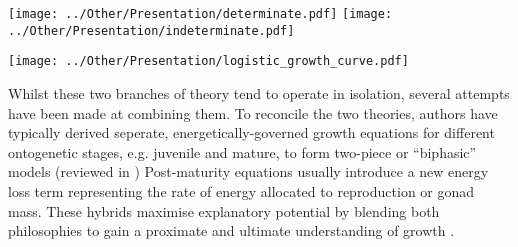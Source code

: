 \documentclass[a4paper]{article} %
\begin{document}
    \begin{center}
        \begin{minipage}{0.48\linewidth}
        \texttt{[image: ../Other/Presentation/determinate.pdf]}
        \label{growth_schedules}
        \texttt{[image: ../Other/Presentation/indeterminate.pdf]}  
        \end{minipage}%
        \hfill
        \begin{minipage}{0.45\linewidth}
            \texttt{[image: ../Other/Presentation/logistic\_growth\_curve.pdf]}  
            \label{logistic_growth}
        \end{minipage}
    \end{center}
    Whilst these two branches of theory tend to operate in isolation, several attempts have been made at combining them. To reconcile the two theories, authors have typically derived seperate, energetically-governed growth equations for different ontogenetic stages, e.g. juvenile and mature, to form two-piece or ``biphasic'' models (reviewed in \cite{Wilson2018}) Post-maturity equations usually introduce a new energy loss term representing the rate of energy allocated to reproduction or gonad mass. These hybrids maximise explanatory potential by blending both philosophies to gain a proximate and ultimate understanding of growth \autocite{Marshall2019b}.    
\end{document}
